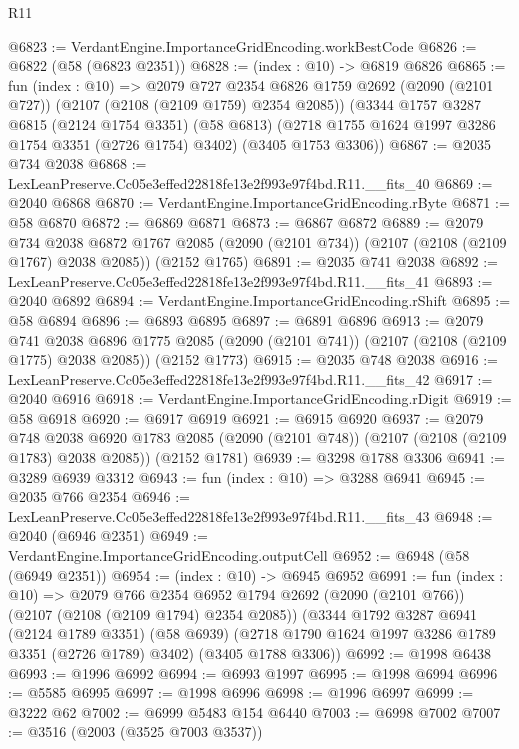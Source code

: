 \begin{lexlean}{R11}
\begin{coremodule}
@6823 := VerdantEngine.ImportanceGridEncoding.workBestCode
@6826 := @6822 (@58 (@6823 @2351))
@6828 := (index : @10) -> @6819 @6826
@6865 := fun (index : @10) =>
  @2079
    @727
    @2354
    @6826
    @1759
    @2692
    (@2090 (@2101 @727))
    (@2107 (@2108 (@2109 @1759) @2354 @2085))
    (@3344
      @1757
      @3287
      @6815
      (@2124 @1754 @3351)
      (@58 @6813)
      (@2718 @1755 @1624 @1997 @3286 @1754 @3351 (@2726 @1754) @3402)
      (@3405 @1753 @3306))
@6867 := @2035 @734 @2038
@6868 := LexLeanPreserve.Cc05e3effed22818fe13e2f993e97f4bd.R11.__fits_40
@6869 := @2040 @6868
@6870 := VerdantEngine.ImportanceGridEncoding.rByte
@6871 := @58 @6870
@6872 := @6869 @6871
@6873 := @6867 @6872
@6889 := @2079
    @734
    @2038
    @6872
    @1767
    @2085
    (@2090 (@2101 @734))
    (@2107 (@2108 (@2109 @1767) @2038 @2085))
    (@2152 @1765)
@6891 := @2035 @741 @2038
@6892 := LexLeanPreserve.Cc05e3effed22818fe13e2f993e97f4bd.R11.__fits_41
@6893 := @2040 @6892
@6894 := VerdantEngine.ImportanceGridEncoding.rShift
@6895 := @58 @6894
@6896 := @6893 @6895
@6897 := @6891 @6896
@6913 := @2079
    @741
    @2038
    @6896
    @1775
    @2085
    (@2090 (@2101 @741))
    (@2107 (@2108 (@2109 @1775) @2038 @2085))
    (@2152 @1773)
@6915 := @2035 @748 @2038
@6916 := LexLeanPreserve.Cc05e3effed22818fe13e2f993e97f4bd.R11.__fits_42
@6917 := @2040 @6916
@6918 := VerdantEngine.ImportanceGridEncoding.rDigit
@6919 := @58 @6918
@6920 := @6917 @6919
@6921 := @6915 @6920
@6937 := @2079
    @748
    @2038
    @6920
    @1783
    @2085
    (@2090 (@2101 @748))
    (@2107 (@2108 (@2109 @1783) @2038 @2085))
    (@2152 @1781)
@6939 := @3298 @1788 @3306
@6941 := @3289 @6939 @3312
@6943 := fun (index : @10) => @3288 @6941
@6945 := @2035 @766 @2354
@6946 := LexLeanPreserve.Cc05e3effed22818fe13e2f993e97f4bd.R11.__fits_43
@6948 := @2040 (@6946 @2351)
@6949 := VerdantEngine.ImportanceGridEncoding.outputCell
@6952 := @6948 (@58 (@6949 @2351))
@6954 := (index : @10) -> @6945 @6952
@6991 := fun (index : @10) =>
  @2079
    @766
    @2354
    @6952
    @1794
    @2692
    (@2090 (@2101 @766))
    (@2107 (@2108 (@2109 @1794) @2354 @2085))
    (@3344
      @1792
      @3287
      @6941
      (@2124 @1789 @3351)
      (@58 @6939)
      (@2718 @1790 @1624 @1997 @3286 @1789 @3351 (@2726 @1789) @3402)
      (@3405 @1788 @3306))
@6992 := @1998 @6438
@6993 := @1996 @6992
@6994 := @6993 @1997
@6995 := @1998 @6994
@6996 := @5585 @6995
@6997 := @1998 @6996
@6998 := @1996 @6997
@6999 := @3222 @62
@7002 := @6999 @5483 @154 @6440
@7003 := @6998 @7002
@7007 := @3516 (@2003 (@3525 @7003 @3537))

\end{coremodule}
\end{lexlean}
